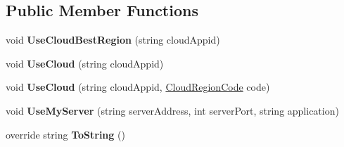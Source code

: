 \subsection*{Public Member Functions}
\begin{DoxyCompactItemize}
\item 
void {\bfseries Use\+Cloud\+Best\+Region} (string cloud\+Appid)\hypertarget{class_server_settings_aeb0c2bda5dd14905c6d82c5166971117}{}\label{class_server_settings_aeb0c2bda5dd14905c6d82c5166971117}

\item 
void {\bfseries Use\+Cloud} (string cloud\+Appid)\hypertarget{class_server_settings_a3fd2ceafc9192779c59a646884ba9810}{}\label{class_server_settings_a3fd2ceafc9192779c59a646884ba9810}

\item 
void {\bfseries Use\+Cloud} (string cloud\+Appid, \hyperlink{_enums_8cs_af823e3be9567fa753720895120c9819b}{Cloud\+Region\+Code} code)\hypertarget{class_server_settings_ae9dc8779d32a07848cb6e9063ae215d6}{}\label{class_server_settings_ae9dc8779d32a07848cb6e9063ae215d6}

\item 
void {\bfseries Use\+My\+Server} (string server\+Address, int server\+Port, string application)\hypertarget{class_server_settings_ae0eef79dfdcf1d7d7577094dadc4ca4b}{}\label{class_server_settings_ae0eef79dfdcf1d7d7577094dadc4ca4b}

\item 
override string {\bfseries To\+String} ()\hypertarget{class_server_settings_a8a1c45242135b589ecc819e132c59655}{}\label{class_server_settings_a8a1c45242135b589ecc819e132c59655}

\end{DoxyCompactItemize}
